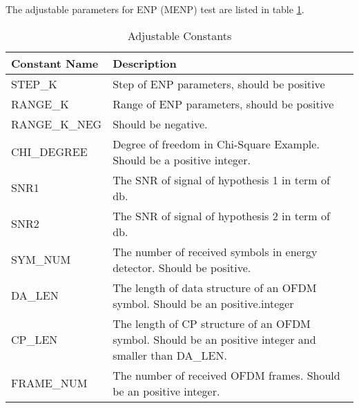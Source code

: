 The adjustable parameters for ENP (MENP) test are listed in table \ref{constantlist}. 
\begin{table}[h]
\begin{tabular}{l|p{350pt}} 
\hline
\hline
Constant Name & Description                                                                                           \\
\hline
STEP\_K       & Step of ENP parameters, should be positive                                                            \\
RANGE\_K      & Range of ENP parameters, should be positive                                                           \\
RANGE\_K\_NEG & Should be negative.                                                                                   \\
CHI\_DEGREE   & Degree of freedom in Chi-Square Example. Should be a positive integer.                                \\
SNR1          & The SNR of signal of hypothesis 1 in term of db.                                                      \\
SNR2          & The SNR of signal of hypothesis 2 in term of db.                                                      \\
SYM\_NUM      & The number of received symbols in energy detector. Should be positive.                                \\
DA\_LEN       & The length of data structure of an OFDM symbol. Should be an positive.integer                         \\
CP\_LEN       & The length of CP structure of an OFDM symbol. Should be an positive integer and smaller than DA\_LEN. \\
FRAME\_NUM    & The number of received OFDM frames. Should be an positive integer.\\
\hline                                   
\end{tabular}
\label{constantlist}
\caption{Adjustable Constants}
\end{table}
